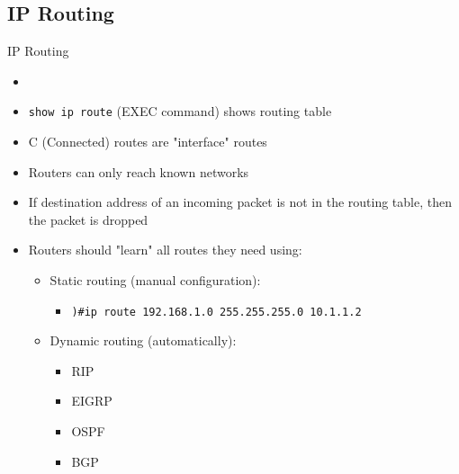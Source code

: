 \subsection{IP Routing}
\begin{frame}{IP Routing}
	\begin{itemize}[<+->]
		\item {}
		\item \texttt{show ip route} (EXEC command) shows routing table
		\item C (Connected) routes are "interface" routes
		\item Routers can only reach known networks
		\item If destination address of an incoming packet is not in the routing table, then the packet is dropped
		\item Routers should "learn" all routes they need using:
		\begin{itemize}
			\item Static routing (manual configuration):
			\begin{itemize}
				\item \texttt{)\#ip route 192.168.1.0 255.255.255.0 10.1.1.2}
			\end{itemize}
			\item Dynamic routing (automatically):
			\begin{itemize}
				\item RIP
				\item EIGRP
				\item OSPF
				\item BGP
			\end{itemize}
		\end{itemize}
	\end{itemize}
\end{frame}

